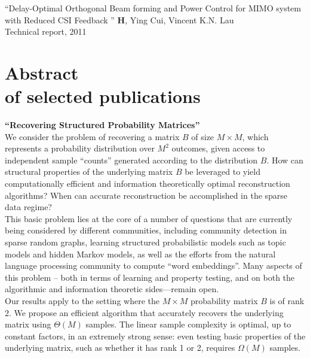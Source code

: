 \documentclass[margin,line,11pt]{resume}
\begin{document}
\begin{resume}
``Delay-Optimal Orthogonal Beam forming and Power Control for MIMO system with Reduced CSI Feedback
'' \textbf{H}, Ying Cui, Vincent K.N. Lau
\\
Technical report, 2011


\section{\mysidestyle Abstract \\ of selected publications}

\textbf{``Recovering Structured Probability Matrices''}
\\
We consider the problem of recovering a matrix $B$ of size $M\times M$, which represents a
probability distribution over $M^2$ outcomes, given access to independent sample ``counts'' generated
according to the distribution $B$. How can structural properties of the underlying matrix $B$ be
leveraged to yield computationally efficient and information theoretically optimal reconstruction
algorithms? When can accurate reconstruction be accomplished in the sparse data regime?
\\
This basic problem lies at the core of a number of questions that are currently being considered by
different communities, including community detection in sparse random graphs, learning structured
probabilistic models such as topic models and hidden Markov models, as well as the efforts from the
natural language processing community to compute ``word embeddings''. Many aspects of this problem --
both in terms of learning and property testing, and on both the algorithmic and information
theoretic sides—remain open.
\\
Our results apply to the setting where the $M\times M$ probability matrix $B$ is of rank 2. We propose an
efficient algorithm that accurately recovers the underlying matrix using $\Theta(M)$ samples. The linear
sample complexity is optimal, up to constant factors, in an extremely strong sense: even testing
basic properties of the underlying matrix, such as whether it has rank 1 or 2, requires $\Omega(M)$
samples.


\end{resume}
\end{document}
